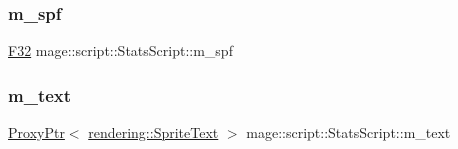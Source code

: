 \subsubsection{\texorpdfstring{m\+\_\+spf}{m\_spf}}
{\footnotesize\ttfamily \mbox{\hyperlink{namespacemage_aa97e833b45f06d60a0a9c4fc22ae02c0}{F32}} mage\+::script\+::\+Stats\+Script\+::m\+\_\+spf\hspace{0.3cm}{\ttfamily [private]}}

\mbox{\label{classmage_1_1script_1_1_stats_script_a1fe11e7a3622fa5e3585fb6786e2d2e7}} 
\subsubsection{\texorpdfstring{m\+\_\+text}{m\_text}}
{\footnotesize\ttfamily \mbox{\hyperlink{classmage_1_1_proxy_ptr}{Proxy\+Ptr}}$<$ \mbox{\hyperlink{classmage_1_1rendering_1_1_sprite_text}{rendering\+::\+Sprite\+Text}} $>$ mage\+::script\+::\+Stats\+Script\+::m\+\_\+text\hspace{0.3cm}{\ttfamily [private]}}

